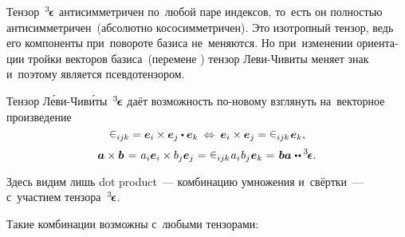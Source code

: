 \begin{otherlanguage}{russian}
Тензор~${^3\hspace{-0.25ex}\bm{\epsilon}}\hspace{.05ex}$ антисимметричен по~любой паре индексов, то~есть он полностью антисимметричен~(абсолютно кососимметричен). Это изотропный тензор, ведь его компоненты при~повороте базиса не~меняются.
Но при~изменении ориентации тройки векторов базиса~(перемене )
тензор Леви\hbox{-\!}Чивиты меняет знак и~поэтому является псевдотензором.

Тензор Л\'{е}ви\hbox{-\!}Чив\'{и}ты~${^3\hspace{-0.25ex}\bm{\epsilon}}\hspace{.05ex}$ даёт возможность по\hbox{-}новому взглянуть на~векторное произведение
\[
\levicivita_{ijk} = \bm{e}_i \times \bm{e}_j \dotp \bm{e}_k \:\Leftrightarrow\: \bm{e}_i \times \bm{e}_j %
= \levicivita_{ijk} \hspace{0.2ex} \bm{e}_k,
\]\vspace{-1em}
\begin{equation}
\bm{a} \times \bm{b} \hspace{0.2ex} = \hspace{0.2ex} a_i \bm{e}_i \times b_j \bm{e}_j \hspace{0.1ex} = \hspace{0.1ex} \levicivita_{ijk} \hspace{0.2ex} a_i \hspace{0.1ex} b_j \hspace{0.1ex} \bm{e}_k \hspace{0.1ex} =\hspace{0.2ex} \bm{b}\bm{a} \hspace{0.1ex} \dotdotp \levicivitatensor.
\end{equation}

\vspace{-0.4em} \noindent Здесь видим лишь dot product~--- комбинацию умножения и~свёртки~--- с~участием тензора~${^3\hspace{-0.25ex}\bm{\epsilon}}\hspace{.05ex}$.

Такие комбинации возможны с~любыми тензорами:


\end{otherlanguage}
